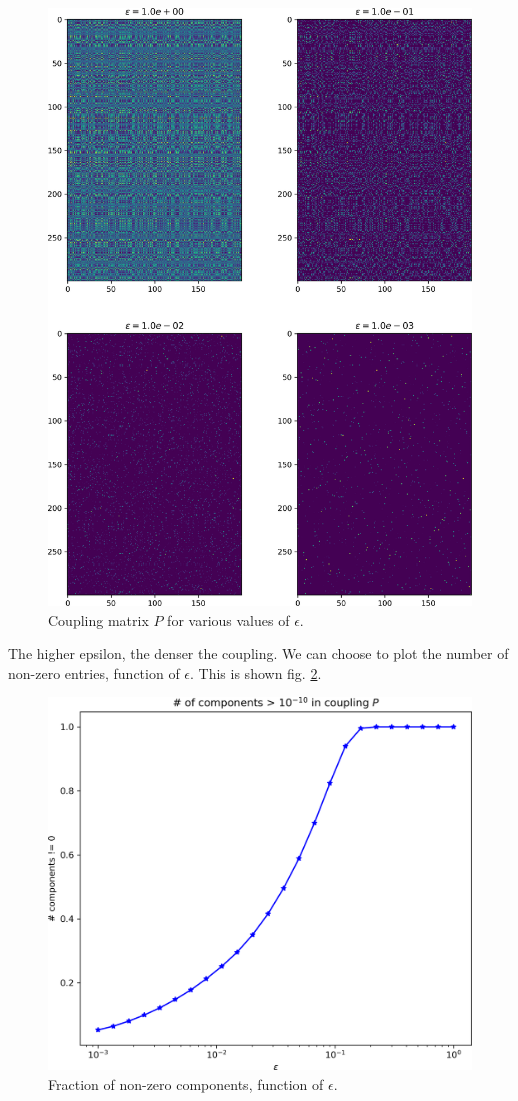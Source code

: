 \begin{figure}[h]
    \centering
    \includegraphics[width=.7\linewidth]{samples/2/coupling_function_of_eps.png}
    \caption{Coupling matrix $P$ for various values of $\epsilon$.}
    \label{fig:coupling_function_of_eps}
\end{figure}

The higher epsilon, the denser the coupling. We can choose to plot the number of non-zero entries, function of $\epsilon$. This is shown fig. \ref{fig:fraction_null}.

\begin{figure}[h]
    \centering
    \includegraphics[width=.7\textwidth]{samples/2/fraction_null_components.png}
    \caption{Fraction of non-zero components, function of $\epsilon$.}
    \label{fig:fraction_null}
\end{figure}

